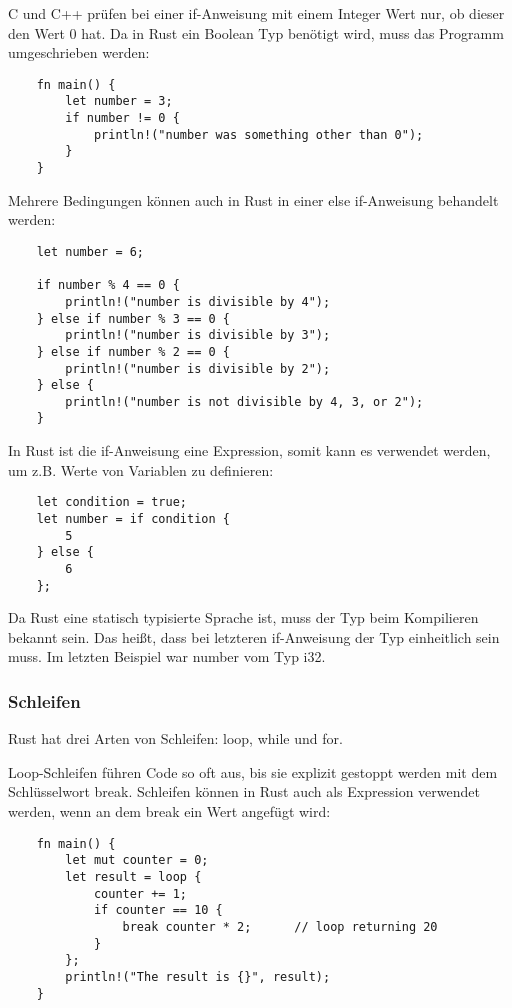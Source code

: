 C und C++ prüfen bei einer if-Anweisung mit einem Integer Wert nur, ob dieser den Wert 0 hat. Da in Rust ein Boolean Typ benötigt wird, muss das Programm umgeschrieben werden:

\begin{lstlisting}
    fn main() {
        let number = 3;
        if number != 0 {
            println!("number was something other than 0");
        }
    }
\end{lstlisting}

Mehrere Bedingungen können auch in Rust in einer \glqq else if\grqq{}-Anweisung behandelt werden:

\begin{lstlisting}
    let number = 6;

    if number % 4 == 0 {
        println!("number is divisible by 4");
    } else if number % 3 == 0 {
        println!("number is divisible by 3");
    } else if number % 2 == 0 {
        println!("number is divisible by 2");
    } else {
        println!("number is not divisible by 4, 3, or 2");
    }
\end{lstlisting}

In Rust ist die if-Anweisung eine Expression, somit kann es verwendet werden, um z.B. Werte von Variablen zu definieren:

\begin{lstlisting}
    let condition = true;
    let number = if condition {
        5
    } else {
        6
    };
\end{lstlisting}

Da Rust eine statisch typisierte Sprache ist, muss der Typ beim Kompilieren bekannt sein. Das heißt, dass bei letzteren if-Anweisung der Typ einheitlich sein muss. Im letzten Beispiel war \glqq number\grqq{} vom Typ \glqq i32\grqq{}.

\subsubsection{Schleifen}

Rust hat drei Arten von Schleifen: loop, while und for.

Loop-Schleifen führen Code so oft aus, bis sie explizit gestoppt werden mit dem Schlüsselwort \glqq break\grqq{}. Schleifen können in Rust auch als Expression verwendet werden, wenn an dem \glqq break\grqq{} ein Wert angefügt wird:

\begin{lstlisting}
    fn main() {
        let mut counter = 0;
        let result = loop {
            counter += 1;
            if counter == 10 {
                break counter * 2;      // loop returning 20
            }
        };
        println!("The result is {}", result);
    }
\end{lstlisting}


